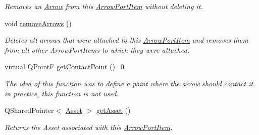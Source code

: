 \begin{DoxyCompactItemize}
\begin{DoxyCompactList}\small\item\em Removes an \hyperlink{class_arrow}{Arrow} from this \hyperlink{class_arrow_port_item}{Arrow\-Port\-Item} without deleting it. \end{DoxyCompactList}\item 
void \hyperlink{class_arrow_port_item_a6bfc3325592e7eca77478c9d2f7bf7ae}{remove\-Arrows} ()
\begin{DoxyCompactList}\small\item\em Deletes all arrows that were attached to this \hyperlink{class_arrow_port_item}{Arrow\-Port\-Item} and removes them from all other Arrow\-Port\-Items to which they were attached. \end{DoxyCompactList}\item 
\hypertarget{class_arrow_port_item_a6de9b18c93c5ae693b6ab121a569a63d}{virtual Q\-Point\-F \hyperlink{class_arrow_port_item_a6de9b18c93c5ae693b6ab121a569a63d}{get\-Contact\-Point} ()=0}\label{class_arrow_port_item_a6de9b18c93c5ae693b6ab121a569a63d}

\begin{DoxyCompactList}\small\item\em The idea of this function was to define a point where the arrow should contact it. in practice, this function is not used. \end{DoxyCompactList}\item 
\hypertarget{class_arrow_port_item_a19c64e1cb85cb13a9cd817099c11da87}{Q\-Shared\-Pointer$<$ \hyperlink{class_picto_1_1_asset}{Asset} $>$ \hyperlink{class_arrow_port_item_a19c64e1cb85cb13a9cd817099c11da87}{get\-Asset} ()}\label{class_arrow_port_item_a19c64e1cb85cb13a9cd817099c11da87}

\begin{DoxyCompactList}\small\item\em Returns the Asset associated with this \hyperlink{class_arrow_port_item}{Arrow\-Port\-Item}. \end{DoxyCompactList}\end{DoxyCompactItemize}
